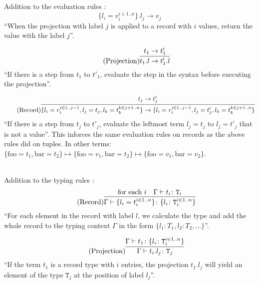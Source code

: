 Addition to the evaluation rules \cite{pierce2002ProgLang}:
\begin{equation*}
    \tag{Record projection}
    \{l_i = v_i^{i \in 1..n}\} . l_j \rightarrow v_j
\end{equation*}
``When the projection with label $j$ is applied to a record with
$i$ values, return the value with the label $j$''.

\begin{equation*}
    \tag{Projection}
    \infer{
        t_1 . l \rightarrow t'_1 . l
    }{
        t_1 \rightarrow t'_1
    }
\end{equation*}
``If there is a step from $t_1$ to $t'_1$, evaluate the step
in the syntax before executing the projection''.

\begin{equation*}
    \tag{Record}
    \infer{
    \{l_i = v_i^{i \in 1..j-1}, l_j = t_j, l_k = t_k^{k \in j+1..n}\}
    \rightarrow \{l_i = v_i^{i \in 1..j-1}, l_j = t'_j, l_k = t_k^{k \in j+1..n}\}
    }{
    t_j \rightarrow t'_j
    }
\end{equation*}
``If there is a step from $t_j$ to $t'_j$, evaluate the leftmost
term $l_j = t_j$ to $l_j = t'_j$ that is not a value''. This inforces
the same evaluation rules on records as the above rules did on tuples.
In other terms:
$\{\text{foo}=t_1, \text{bar}=t_2\} \mapsto \{\text{foo}=v_1, \text{bar}=t_2\} \mapsto \{\text{foo}=v_1, \text{bar}=v_2\}$.

~\\
Addition to the typing rules \cite{pierce2002ProgLang}:
\begin{equation*}
    \tag{Record}
    \infer{
    \Gamma \vdash \{l_i = t_i^{i \in 1..n}\} \colon \{l_i \colon \texttt{T}_i^{i \in 1..n}\}
    }{
    \text{for each } i & \Gamma \vdash t_i \colon \texttt{T}_i
    }
\end{equation*}
``For each element in the record with label $l$, we calculate the type
and add the whole record to the typing context $\Gamma$ in the form
$\{l_1 \colon T_1, l_2 \colon T_2, \dots\}$''.

\begin{equation*}
    \tag{Projection}
    \infer{
    \Gamma \vdash t_i . l_j \colon \texttt{T}_j
    }{
    \Gamma \vdash t_1 \colon \{l_i \colon \texttt{T}_i^{i \in 1..n}\}
    }
\end{equation*}
``If the term $t_1$ is a record type with $i$ entries, the projection
$t_1 . l_j$ will yield an element of the type $\texttt{T}_j$ at
the position of label $l_j$''.


